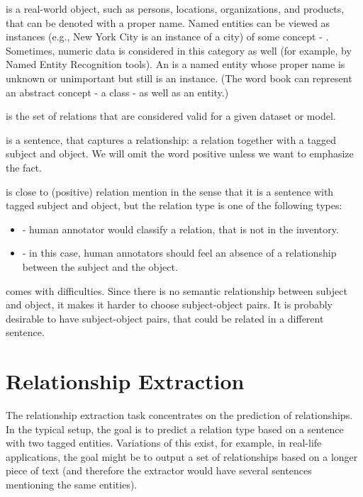  is a real-world object, such as persons, locations, organizations, and products, that can be denoted with a proper name. Named entities can be viewed as instances (e.g., New York City is an instance of a city) of some concept - . Sometimes, numeric data is considered in this category as well (for example, by Named Entity Recognition tools). An  is a named entity whose proper name is unknown or unimportant but still is an instance. (The word book can represent an abstract concept - a class - as well as an entity.) 

 is the set of relations that are considered valid for a given dataset or model.

 is a sentence, that captures a relationship: a relation together with a tagged subject and object. We will omit the word positive unless we want to emphasize the fact.

 is close to (positive) relation mention in the sense that it is a sentence with tagged subject and object, but the relation type is one of the following types: 
\begin{itemize}
\item {} - human annotator would classify a relation, that is not in the inventory.
\item {} - in this case, human annotators should feel an absence of a relationship between the subject and the object. 

\end{itemize}

 comes with difficulties. Since there is no semantic relationship between subject and object, it makes it harder to choose subject-object pairs. It is probably desirable to have subject-object pairs, that could be related in a different sentence.


\section{Relationship Extraction}
The relationship extraction task concentrates on the prediction of relationships. In the typical setup, the goal is to predict a relation type based on a sentence with two tagged entities. Variations of this exist, for example, in real-life applications, the goal might be to output a set of relationships based on a longer piece of text (and therefore the extractor would have several sentences mentioning the same entities). 

